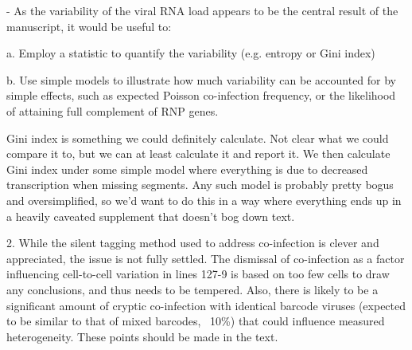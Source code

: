 \documentclass[11pt, oneside]{article}   	%
\begin{document}
- As the variability of the viral RNA load appears to be the central result of the manuscript, it would be useful to: 

    a. Employ a statistic to quantify the variability (e.g. entropy or Gini index) 

    b. Use simple models to illustrate how much variability can be accounted for by simple effects, such as expected Poisson co-infection frequency, or the likelihood of attaining full complement of RNP genes. 
    
{\color{red}
Gini index is something we could definitely calculate. Not clear what we could compare it to, but we can at least calculate it and report it.
We then calculate Gini index under some simple model where everything is due to decreased transcription when missing segments.
Any such model is probably pretty bogus and oversimplified, so we'd want to do this in a way where everything ends up in a heavily caveated supplement that doesn't bog down text.
}


2. While the silent tagging method used to address co-infection is clever and appreciated, the issue is not fully settled. The dismissal of co-infection as a factor influencing cell-to-cell variation in lines 127-9 is based on too few cells to draw any conclusions, and thus needs to be tempered. Also, there is likely to be a significant amount of cryptic co-infection with identical barcode viruses (expected to be similar to that of mixed barcodes, ~10\%) that could influence measured heterogeneity. These points should be made in the text. 
\end{document}
